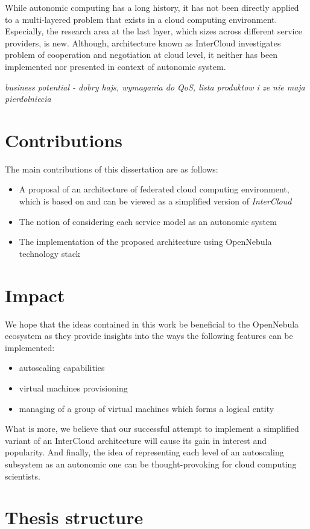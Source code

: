 While autonomic computing has a long history, it has not been directly applied to a multi-layered problem that exists in a cloud computing environment. Especially, the research area at the last layer, which sizes across different service providers, is new. Although, architecture known as InterCloud investigates problem of cooperation and negotiation at cloud level, it neither has been implemented nor presented in context of autonomic system.

\textit{business potential - dobry hajs, wymagania do QoS, lista produktow i ze nie maja pierdolniecia}

\section{Contributions}
The main contributions of this dissertation are as follows:
\begin{itemize}
  \item A proposal of an architecture of federated cloud computing environment, which is based on and can be viewed as a simplified version of \emph{InterCloud}
  \item The notion of considering each service model as an autonomic system
  \item The implementation of the proposed architecture using OpenNebula technology stack
\end{itemize}

\section{Impact}
We hope that the ideas contained in this work be beneficial to the OpenNebula ecosystem as they provide insights into the ways the following features can be implemented:
\begin{itemize}
  \item autoscaling capabilities
  \item virtual machines provisioning
  \item managing of a group of virtual machines which forms a logical entity
\end{itemize}
What is more, we believe that our successful attempt to implement a simplified variant of an InterCloud architecture will cause its gain in interest and popularity. And finally, the idea of representing each level of an autoscaling subsystem as an autonomic one can be thought-provoking for cloud computing scientists.

\section{Thesis structure}
